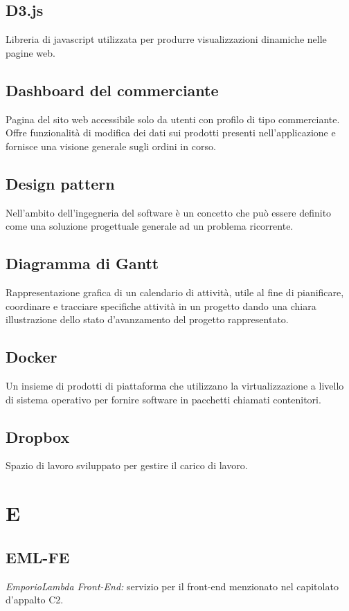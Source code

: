 \subsection*{D3.js}
Libreria di javascript utilizzata per produrre visualizzazioni dinamiche nelle pagine web.

\subsection*{Dashboard del commerciante}
Pagina del sito web accessibile solo da utenti con profilo di tipo commerciante. Offre funzionalità di modifica dei dati sui prodotti presenti nell'applicazione e fornisce una visione generale sugli ordini in corso.

\subsection*{Design pattern}
Nell’ambito dell’ingegneria del software è un concetto che può essere definito come una soluzione progettuale generale ad un problema ricorrente.

\subsection*{Diagramma di Gantt}
Rappresentazione grafica di un calendario di attività, utile al fine di pianificare, coordinare e tracciare specifiche attività in un progetto dando una chiara illustrazione dello stato d'avanzamento del progetto rappresentato.

\subsection*{Docker}
Un insieme di prodotti di piattaforma che utilizzano la virtualizzazione a livello di sistema operativo per fornire software in pacchetti chiamati contenitori.

\subsection*{Dropbox}
Spazio di lavoro sviluppato per gestire il carico di lavoro. 

\newpage
\section{E}
\subsection*{EML-FE}
\textit{EmporioLambda Front-End:} servizio per il front-end menzionato nel capitolato d'appalto C2.

